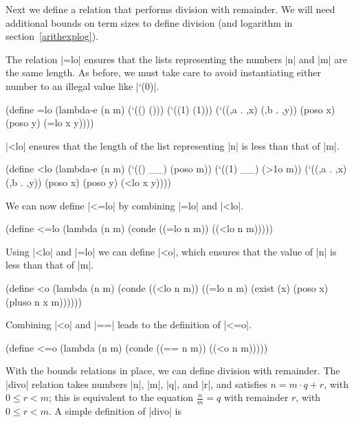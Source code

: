 Next we define a relation that performs division with remainder.  We
will need additional bounds on term sizes to define division (and
logarithm in section~\ref{arithexplog}).

The relation \scheme|=lo| ensures that the lists representing the numbers
\scheme|n| and \scheme|m| are the same length.  As before, we must
take care to avoid instantiating either number to an illegal value
like \scheme|`(0)|.

\schemedisplayspace
\begin{schemedisplay}
(define =lo
  (lambda-e (n m)
    (`(() ()))
    (`((1) (1)))
    (`((,a . ,x) (,b . ,y)) (poso x) (poso y)
     (=lo x y))))
\end{schemedisplay}

\scheme|<lo| ensures that the length of the list representing \scheme|n| is
less than that of \scheme|m|.

\schemedisplayspace
\begin{schemedisplay}
(define <lo
  (lambda-e (n m)
    (`(() __) (poso m))
    (`((1) __) (>1o m))
    (`((,a . ,x) (,b . ,y)) (poso x) (poso y)
     (<lo x y))))
\end{schemedisplay}

We can now define \scheme|<=lo| by combining \scheme|=lo| and \scheme|<lo|.

\schemedisplayspace
\begin{schemedisplay}
(define <=lo
  (lambda (n m)
    (conde
      ((=lo n m))
      ((<lo n m)))))
\end{schemedisplay}

Using \scheme|<lo| and \scheme|=lo| we can define \scheme|<o|, which
ensures that the value of \scheme|n| is less than that of \scheme|m|.

\schemedisplayspace
\begin{schemedisplay}
(define <o
  (lambda (n m)
    (conde
      ((<lo n m))
      ((=lo n m)
       (exist (x)
         (poso x)
         (pluso n x m))))))
\end{schemedisplay}

Combining \scheme|<o| and \scheme|==| leads to the definition of
\scheme|<=o|.

\schemedisplayspace
\begin{schemedisplay}
(define <=o
  (lambda (n m)
    (conde
      ((== n m))
      ((<o n m)))))
\end{schemedisplay}

With the bounds relations in place, we can define division with
remainder.  The \scheme|divo| relation takes numbers \scheme|n|,
\scheme|m|, \scheme|q|, and \scheme|r|, and satisfies $n = m \cdot q +
r$, with $0 \leq r < m$; this is equivalent to the equation $\frac{n}{m} = q$
with remainder $r$, with $0 \leq r < m$.
A simple definition of \scheme|divo| is 

